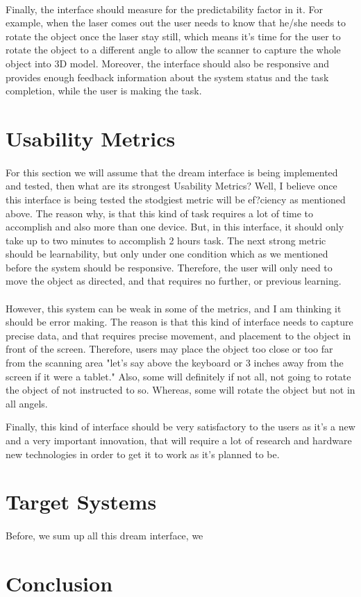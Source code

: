 \documentclass[12pt, oneside]{article}   	%
\begin{document}
\paragraph{}
Finally, the interface should measure for the predictability factor in it.  For example, when the laser comes out the user needs to know that he/she needs to rotate the object once the laser stay still, which means it's time for the user to rotate the object to a different angle to allow the scanner to capture the whole object into 3D model.
Moreover, the interface should also be responsive and provides enough feedback information about the system status and the task completion, while the user is making the task.
\section{Usability Metrics}
\paragraph{}
For this section we will assume that the dream interface is being implemented and tested, then what are its strongest Usability Metrics?  Well, I believe once this interface is being tested the stodgiest metric will be ef?ciency as mentioned above.  The reason why, is that this kind of task requires a lot of time to accomplish and also more than one device. But, in this interface, it should only take up to two minutes to accomplish 2 hours task.  The next strong metric should be learnability, but only under one condition which as we mentioned before the system should be responsive.  Therefore, the user will only need to move the object as directed, and that requires no further, or previous learning. 
\paragraph{}
However, this system can be weak in some of the metrics, and I am thinking it should be error making.  The reason is that this kind of interface needs to capture precise data, and that requires precise movement, and placement to the object in front of the screen.  Therefore, users may place the object too close or too far from the scanning area "let's say above the keyboard or 3 inches away from the screen if it were a tablet."  Also, some will definitely if not all, not going to rotate the object of not instructed to so. Whereas, some will rotate the object but not in all angels.  

Finally, this kind of interface should be very satisfactory to the users as it's a new and a very important innovation, that will require a lot of research and hardware new technologies in order to get it to work as it's planned to be.

\section{Target Systems}
\paragraph{}
Before, we sum up all this dream interface, we 
\section{Conclusion}
\paragraph{}
\end{document}
